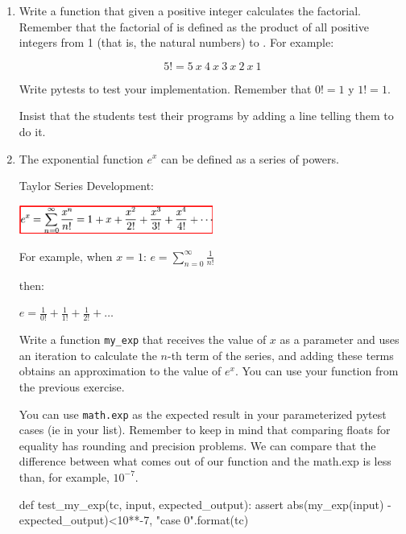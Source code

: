 \documentclass[
  fontsize=10pt,
  a4paper,
]{scrartcl}
\newenvironment{howTILEd}%
  {\begin{mdframed}[skipabove=10pt,skipbelow=10pt,backgroundcolor=pink!40]}%
  {\end{mdframed}}
\begin{document}
\begin{enumerate}
\item Write a function  that given a positive integer  calculates the factorial.
%
Remember that the factorial of  is defined as the product of all positive integers from 1 (that is, the natural numbers) to . For example:

\[5! = 5\ x\ 4\ x\ 3\ x\ 2\ x\ 1\]

Write pytests to test your implementation. Remember that $0! = 1$ y $1! = 1$. 

\begin{howTILEd}
Insist that the students test their programs by adding a line telling them to do it.
\end{howTILEd}


\item The exponential function $e^x$ can be defined as a series of powers.

Taylor Series Development:

\includegraphics[width=0.5\textwidth]{images/Taylor.png}

For example, when $x = 1$:
$
e =  \sum_{n=0}^{\infty} \frac{1}{n!}
$

then:

$
e = \frac{1}{0!} +  \frac{1}{1!} + \frac{1}{2!} +  \dots
$

Write a function \texttt{my\_exp} that receives the value of $x$ as a parameter and uses an iteration to calculate the $n$-th term of the series, and adding these terms obtains an approximation to the value of $e^x$. You can use your  function from the previous exercise.


You can use \texttt {math.exp} as the expected result in your parameterized pytest cases (ie in your  list). Remember to keep in mind that comparing floats for equality has rounding and precision problems. We can compare that the difference between what comes out of our function and the math.exp is less than, for example, $10^{-7}$.

\begin{small}
\begin{python}
def test_my_exp(tc, input, expected_output):
    assert abs(my_exp(input) - expected_output)<10**-7, "case {0}".format(tc)
\end{python}
\end{small}



\end{enumerate}
\end{document}
